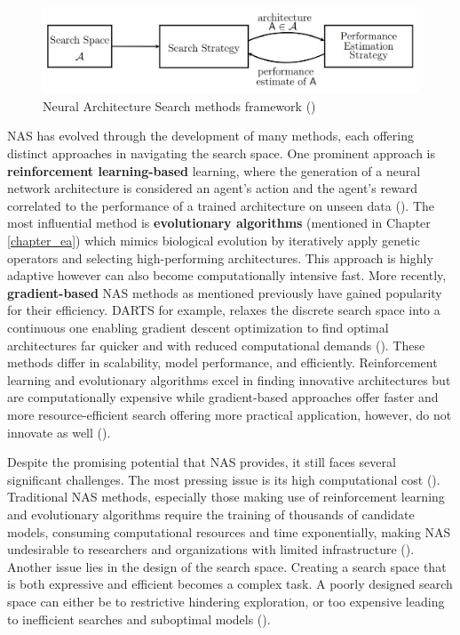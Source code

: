 \parbreak
\begin{figure}[H] %
	\centering %
	\includegraphics[width=\textwidth]{Figures/chapter_ne/ne_nas.png} %
	\caption{Neural Architecture Search methods framework (\cite{elsken2019neural})}
	\label{fig:ne_nas} %
\end{figure}

\parbreak\noindent NAS has evolved through the development of many methods, each offering distinct approaches in navigating the search space. One prominent approach is \textbf{reinforcement learning-based} learning, where the generation of a neural network architecture is considered an agent's action and the agent's reward correlated to the performance of a trained architecture on unseen data (\cite{elsken2019neural}). The most influential method is \textbf{evolutionary algorithms} (mentioned in Chapter \ref{chapter_ea}) which mimics biological evolution by iteratively apply genetic operators and selecting high-performing architectures. This approach is highly adaptive however can also become computationally intensive fast. More recently, \textbf{gradient-based} NAS methods as mentioned previously have gained popularity for their efficiency. DARTS for example, relaxes the discrete search space into a continuous one enabling gradient descent optimization to find optimal architectures far quicker and with reduced computational demands (\cite{liu2021survey}). These methods differ in scalability, model performance, and efficiently. Reinforcement learning and evolutionary algorithms excel in finding innovative architectures but are computationally expensive while gradient-based approaches offer faster and more resource-efficient search offering more practical application, however, do not innovate as well (\cite{elsken2019neural}).

\parbreak\noindent Despite the promising potential that NAS provides, it still faces several significant challenges. The most pressing issue is its high computational cost (\cite{liu2021survey}). Traditional NAS methods, especially those making use of reinforcement learning and evolutionary algorithms require the training of thousands of candidate models, consuming computational resources and time exponentially, making NAS undesirable to researchers and organizations with limited infrastructure (\cite{elsken2019neural}). Another issue lies in the design of the search space. Creating a search space that is both expressive and efficient becomes a complex task. A poorly designed search space can either be to restrictive hindering exploration, or too expensive leading to inefficient searches and suboptimal models (\cite{liu2021survey}).

